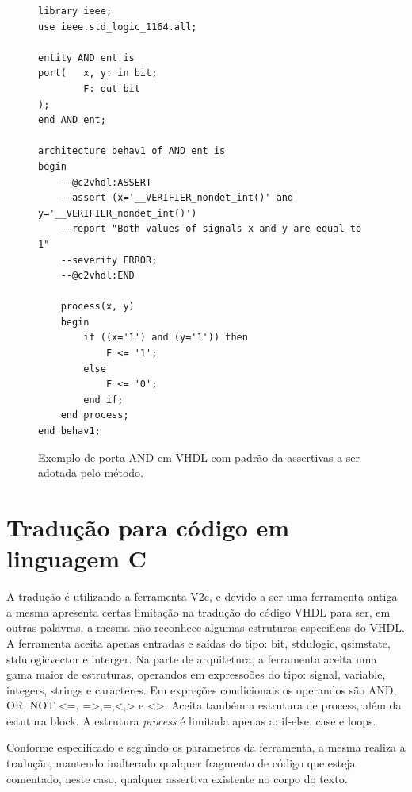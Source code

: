 \begin{figure}[thp]
\caption{\label{fig:code_and} Exemplo de porta AND em VHDL com padrão da assertivas a ser adotada pelo método.}
	\begin{center}
    \begin{minipage}{0.6\textwidth}
    \begin{lstlisting}       
library ieee;
use ieee.std_logic_1164.all;

entity AND_ent is
port(   x, y: in bit;
        F: out bit
);
end AND_ent;

architecture behav1 of AND_ent is
begin
    --@c2vhdl:ASSERT
    --assert (x='__VERIFIER_nondet_int()' and y='__VERIFIER_nondet_int()')
    --report "Both values of signals x and y are equal to 1"
    --severity ERROR;
    --@c2vhdl:END
    
    process(x, y)
    begin
        if ((x='1') and (y='1')) then
            F <= '1';
        else
            F <= '0';
        end if;
    end process;
end behav1;

\end{lstlisting}
    \end{minipage}
	\end{center}
\end{figure}

\section{\label{cap:traducao}Tradução para código em linguagem C}
A tradução é utilizando a ferramenta V2c, e devido a ser uma ferramenta antiga a mesma apresenta certas limitação na tradução do código VHDL para ser, em outras palavras, a mesma não reconhece algumas estruturas especificas do VHDL. A ferramenta aceita apenas entradas e saídas do tipo: bit, std\underline{\space}ulogic, qsim\underline{\space}state, std\underline{\space}ulogic\underline{\space}vector e interger. Na parte de arquitetura, a ferramenta aceita uma gama maior de estruturas, operandos em expressoões do tipo: signal, variable, integers, strings e caracteres. Em expreções condicionais os operandos são AND, OR, NOT <=, =>,=,<,> e <>. Aceita também a estrutura de process, além da estutura block. A estrutura \textit{process} é limitada apenas a: if-else, case e  loops.

\par
Conforme especificado e seguindo os parametros da ferramenta, a mesma realiza a tradução, mantendo inalterado qualquer fragmento de código que esteja comentado, neste caso, qualquer assertiva existente no corpo do texto.
